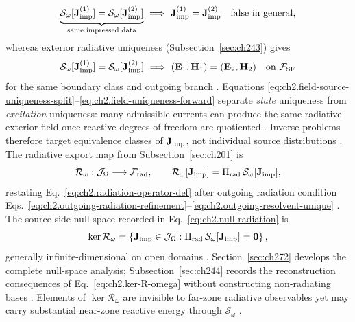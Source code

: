 \begin{equation}
\label{eq:ch2.field-source-uniqueness-split}
\underbrace{\mathcal{S}_\omega[\mathbf{J}_{\mathrm{imp}}^{(1)}]=\mathcal{S}_\omega[\mathbf{J}_{\mathrm{imp}}^{(2)}]}_{\text{same impressed data}}
\ \Longrightarrow\
\mathbf{J}_{\mathrm{imp}}^{(1)}=\mathbf{J}_{\mathrm{imp}}^{(2)}
\quad\text{false in general},
\end{equation}
whereas exterior radiative uniqueness (Subsection~\ref{sec:ch243}) gives
\begin{equation}
\label{eq:ch2.field-uniqueness-forward}
\mathcal{S}_\omega[\mathbf{J}_{\mathrm{imp}}^{(1)}]=\mathcal{S}_\omega[\mathbf{J}_{\mathrm{imp}}^{(2)}]
\ \Longrightarrow\
(\mathbf{E}_1,\mathbf{H}_1)=(\mathbf{E}_2,\mathbf{H}_2)
\quad\text{on}\ \mathcal{F}_{\mathrm{SF}}
\end{equation}
for the same boundary class and outgoing branch \cite{stratton1941}. Equations
\eqref{eq:ch2.field-source-uniqueness-split}--\eqref{eq:ch2.field-uniqueness-forward}
separate \emph{state} uniqueness from \emph{excitation} uniqueness: many admissible
currents can produce the same radiative exterior field once reactive degrees of
freedom are quotiented \cite{harrington2001}. Inverse problems therefore target
equivalence classes of \(\mathbf{J}_{\mathrm{imp}}\), not individual source distributions
\cite{stratton1941}.
The radiative export map from Subsection~\ref{sec:ch201} is
\begin{equation}
\label{eq:ch2.radiation-forward-map}
\mathcal{R}_\omega:\mathcal{J}_\Omega\longrightarrow\mathcal{F}_{\mathrm{rad}},
\qquad
\mathcal{R}_\omega[\mathbf{J}_{\mathrm{imp}}]=\Pi_{\mathrm{rad}}\,\mathcal{S}_\omega[\mathbf{J}_{\mathrm{imp}}],
\end{equation}
restating Eq.~\eqref{eq:ch2.radiation-operator-def} after outgoing radiation condition
Eqs.~\eqref{eq:ch2.outgoing-radiation-refinement}--\eqref{eq:ch2.outgoing-resolvent-unique}
\cite{stratton1941}. The source-side null space recorded in
Eq.~\eqref{eq:ch2.null-radiation} is
\begin{equation}
\label{eq:ch2.ker-R-omega}
\ker\mathcal{R}_\omega
=
\left\{
\mathbf{J}_{\mathrm{imp}}\in\mathcal{J}_\Omega:
\Pi_{\mathrm{rad}}\,\mathcal{S}_\omega[\mathbf{J}_{\mathrm{imp}}]=\mathbf{0}
\right\},
\end{equation}
generally infinite-dimensional on open domains \cite{harrington2001}.
Section~\ref{sec:ch272} develops the complete null-space analysis; Subsection~\ref{sec:ch244}
records the reconstruction consequences of Eq.~\eqref{eq:ch2.ker-R-omega}
without constructing non-radiating bases \cite{stratton1941}. Elements of
\(\ker\mathcal{R}_\omega\) are invisible to far-zone radiative observables yet may
carry substantial near-zone reactive energy through \(\mathcal{S}_\omega\)
\cite{harrington2001}.

